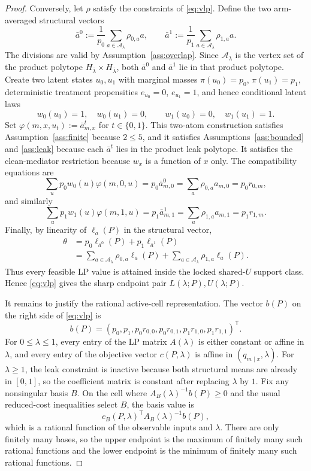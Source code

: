 \documentclass[11pt]{article}
\theoremstyle{definition}
\theoremstyle{plain}
\theoremstyle{remark}
\begin{document}
\begin{proof}
Conversely, let \(\rho\) satisfy the constraints of \eqref{eq:vlp}. Define the two arm-averaged structural
vectors
\[
  \bar a^0:=\frac{1}{p_0}\sum_{a\in\mathcal A_\lambda}\rho_{0,a}a,
  \qquad
  \bar a^1:=\frac{1}{p_1}\sum_{a\in\mathcal A_\lambda}\rho_{1,a}a.
\]
The divisions are valid by Assumption~\ref{ass:overlap}. Since \(\mathcal A_\lambda\) is the vertex set of the
product polytope \(H_{\bar\lambda}\times H_{\bar\lambda}\), both \(\bar a^0\) and \(\bar a^1\) lie in that
product polytope. Create two latent states \(u_0,u_1\) with marginal masses
\(\pi(u_0)=p_0\), \(\pi(u_1)=p_1\), deterministic treatment propensities
\(e_{u_0}=0\), \(e_{u_1}=1\), and hence conditional latent laws
\[
  w_0(u_0)=1,\quad w_0(u_1)=0,\qquad
  w_1(u_0)=0,\quad w_1(u_1)=1.
\]
Set \(\varphi(m,x,u_t):=\bar a^t_{m,x}\) for \(t\in\{0,1\}\). This two-atom construction satisfies
Assumption~\ref{ass:finite} because \(2\le5\), and it satisfies Assumptions~\ref{ass:bounded} and
\ref{ass:leak} because each \(\bar a^t\) lies in the product leak polytope. It satisfies the clean-mediator
restriction because \(w_x\) is a function of \(x\) only. The compatibility equations are
\[
  \sum_u p_0w_0(u)\varphi(m,0,u)
  =p_0\bar a^0_{m,0}
  =\sum_a\rho_{0,a}a_{m,0}
  =p_0r_{0,m},
\]
and similarly
\[
  \sum_u p_1w_1(u)\varphi(m,1,u)
  =p_1\bar a^1_{m,1}
  =\sum_a\rho_{1,a}a_{m,1}
  =p_1r_{1,m}.
\]
Finally, by linearity of \(\ell_a(P)\) in the structural vector,
\[
\begin{aligned}
  \theta
  &=p_0\ell_{\bar a^0}(P)+p_1\ell_{\bar a^1}(P)\\
  &=\sum_{a\in\mathcal A_\lambda}\rho_{0,a}\ell_a(P)
    +\sum_{a\in\mathcal A_\lambda}\rho_{1,a}\ell_a(P).
\end{aligned}
\]
Thus every feasible LP value is attained inside the locked shared-\(U\) support class. Hence \eqref{eq:vlp}
gives the sharp endpoint pair \(L(\lambda;P),U(\lambda;P)\).

It remains to justify the rational active-cell representation. The vector \(b(P)\) on the right side of
\eqref{eq:vlp} is
\[
  b(P)=(p_0,p_1,p_0r_{0,0},p_0r_{0,1},p_1r_{1,0},p_1r_{1,1})^\mathsf{T}.
\]
For \(0\le\lambda\le1\), every entry of the LP matrix \(A(\lambda)\) is either constant or affine in
\(\lambda\), and every entry of the objective vector \(c(P,\lambda)\) is affine in
\((q_{m\mid x},\lambda)\). For \(\lambda\ge1\), the leak constraint is inactive because both structural means
are already in \([0,1]\), so the coefficient matrix is constant after replacing \(\lambda\) by \(1\). Fix any
nonsingular basis \(B\). On the cell where \(A_B(\lambda)^{-1}b(P)\ge0\) and the usual reduced-cost
inequalities select \(B\), the basis value is
\[
  c_B(P,\lambda)^\mathsf{T}A_B(\lambda)^{-1}b(P),
\]
which is a rational function of the observable inputs and \(\lambda\). There are only finitely many bases, so
the upper endpoint is the maximum of finitely many such rational functions and the lower endpoint is the
minimum of finitely many such rational functions.


\end{proof}
\end{document}

